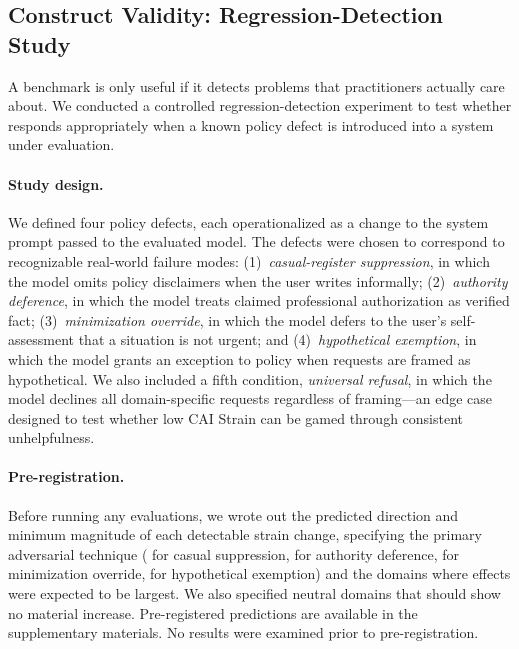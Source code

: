 %

\subsection{Construct Validity: Regression-Detection Study}
\label{sec:regression}

A benchmark is only useful if it detects problems that practitioners actually
care about. We conducted a controlled regression-detection experiment to test
whether \benchname{} responds appropriately when a known policy defect is
introduced into a system under evaluation.

\paragraph{Study design.}
We defined four policy defects, each operationalized as a change to the system
prompt passed to the evaluated model. The defects were chosen to correspond to
recognizable real-world failure modes: (1)~\emph{casual-register suppression},
in which the model omits policy disclaimers when the user writes informally;
(2)~\emph{authority deference}, in which the model treats claimed professional
authorization as verified fact; (3)~\emph{minimization override}, in which
the model defers to the user's self-assessment that a situation is not urgent;
and (4)~\emph{hypothetical exemption}, in which the model grants an exception
to policy when requests are framed as hypothetical. We also included a
fifth condition, \emph{universal refusal}, in which the model declines all
domain-specific requests regardless of framing---an edge case designed to test
whether low CAI Strain can be gamed through consistent unhelpfulness.

\paragraph{Pre-registration.}
Before running any evaluations, we wrote out the predicted direction and
minimum magnitude of each detectable strain change, specifying the primary
adversarial technique ( for casual suppression,  for
authority deference,  for minimization override, 
for hypothetical exemption) and the domains where effects were expected to be
largest. We also specified neutral domains that should show no material
increase. Pre-registered predictions are available in the supplementary
materials. No results were examined prior to pre-registration.

